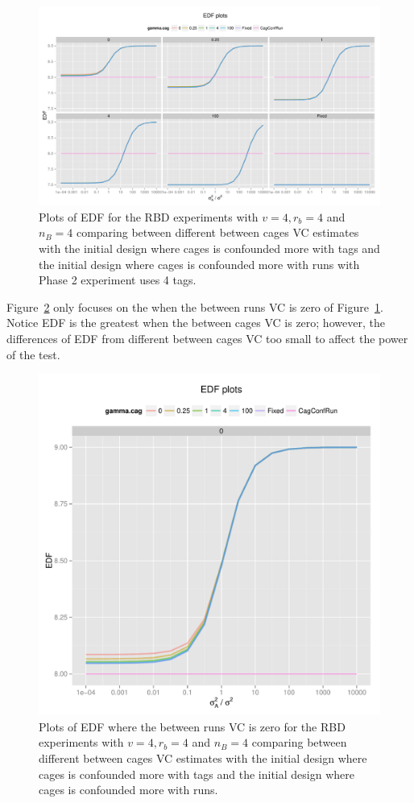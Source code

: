 \documentclass[12pt,a4paper]{article}
\begin{document}
\begin{figure}[ht]
\centering
\includegraphics[width=1 \textwidth]{Graph/RBD442Tag4EDF.pdf}
\caption{Plots of EDF for the RBD experiments with $v = 4, r_b = 4$ and $n_B = 4$ comparing between different between cages VC estimates with the initial design where cages is confounded more with tags and the initial design where cages is confounded more with runs with Phase 2 experiment uses 4 tags.}
\label{fig:RBD442Tag4EDF}
\end{figure}

Figure~\ref{fig:RBD442Tag4EDFRun0} only focuses on the when the between runs VC is zero of Figure~\ref{fig:RBD442Tag4EDF}. Notice EDF is the greatest when the between cages VC is zero; however, the differences of EDF from different between cages VC too small to affect the power of the test.    

\begin{figure}[ht]
\centering
\includegraphics[width=.6 \textwidth]{Graph/RBD442Tag4EDFRun0.pdf}
\caption{Plots of EDF where the between runs VC is zero for the RBD experiments with $v = 4, r_b = 4$ and $n_B = 4$ comparing between different between cages VC estimates with the initial design where cages is confounded more with tags and the initial design where cages is confounded more with runs.}
\label{fig:RBD442Tag4EDFRun0}
\end{figure}
\end{document}
